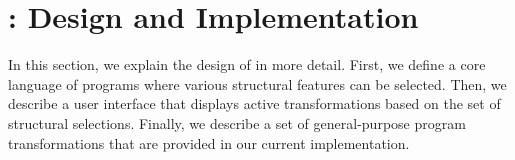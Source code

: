 \section{\deuce{}: Design and Implementation}
\label{sec:deuce}

In this section, we explain the design of \deuce{} in more detail.
First, we define a core language of programs where various structural
features can be selected.
Then, we describe a user interface that displays 
active transformations based on the set of structural selections.
Finally, we describe a set of general-purpose program transformations
that are provided in our current implementation.





